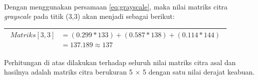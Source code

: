 \begin{adjustbox}{width=1\textwidth}
	\noindent\begin{minipage}{\linewidth}
		\label{fig:MatriksCitraAsal}
	\end{minipage}
\end{adjustbox} \\

\noindent Dengan menggunakan persamaan \ref{eq:grayscale}, maka nilai matriks citra \textit{grayscale} pada titik (3,3) akan menjadi sebagai berikut:
\begin{table}[H]
	\begin{adjustbox}{width=1\textwidth}
		\begin{tabular}{|p{13.55cm}|}
			\hline
			\begin{equation}\nonumber
			\begin{aligned}
			Matriks[3,3] &= (0.299 * 133) + (0.587 * 138) + (0.114 * 144) \\
						 &= 137.189 \approx 137 
			\end{aligned}
			\end{equation}\\
			\hline
		\end{tabular}
	\end{adjustbox}
\end{table}

\noindent Perhitungan di atas dilakukan terhadap seluruh nilai matriks citra asal dan hasilnya adalah matriks citra berukuran 5 $\times$ 5 dengan satu nilai derajat keabuan.

